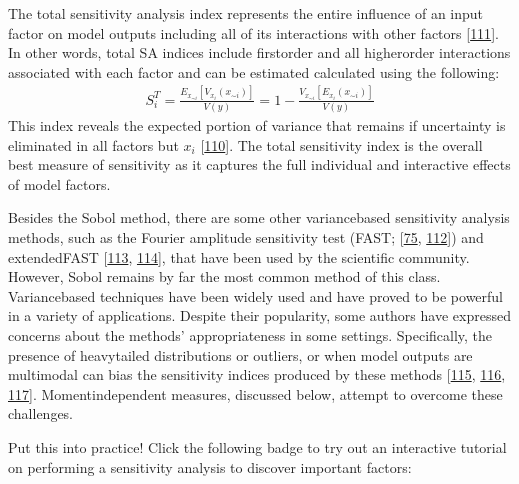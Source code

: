 \documentclass[letterpaper,10pt,english]{sphinxmanual}
\begin{document}
\sphinxAtStartPar
The total sensitivity analysis index represents the entire influence of an input factor on model outputs including all of its interactions with other factors {[}\hyperlink{cite.index:id150}{111}{]}. In other words, total SA indices include first\sphinxhyphen{}order and all higher\sphinxhyphen{}order interactions associated with each factor and can be estimated calculated using the following:
\begin{equation*}
\begin{split}S_i^T= \frac{E_{x_{\sim i}}[V_{x_i}(x_{\sim i})]}{V(y)} = 1 - \frac{V_{x_{\sim i}}[E_{x_{i}}(x_{\sim i})]}{V(y)}\end{split}
\end{equation*}
\sphinxAtStartPar
This index reveals the expected portion of variance that remains if uncertainty is eliminated in all factors but \(x_i\) {[}\hyperlink{cite.index:id149}{110}{]}. The total sensitivity index is the overall best measure of sensitivity as it captures the full individual and interactive effects of model factors.

\sphinxAtStartPar
Besides the Sobol method, there are some other variance\sphinxhyphen{}based sensitivity analysis methods, such as the Fourier amplitude sensitivity test (FAST; {[}\hyperlink{cite.index:id100}{75}, \hyperlink{cite.index:id151}{112}{]}) and extended\sphinxhyphen{}FAST {[}\hyperlink{cite.index:id152}{113}, \hyperlink{cite.index:id153}{114}{]}, that have been used by the scientific community. However, Sobol remains by far the most common method of this class. Variance\sphinxhyphen{}based techniques have been widely used and have proved to be powerful in a variety of applications. Despite their popularity, some authors have expressed concerns about the methods’ appropriateness in some settings. Specifically, the presence of heavy\sphinxhyphen{}tailed distributions or outliers, or when model outputs are multimodal can bias the sensitivity indices produced by these methods {[}\hyperlink{cite.index:id154}{115}, \hyperlink{cite.index:id155}{116}, \hyperlink{cite.index:id156}{117}{]}. Moment\sphinxhyphen{}independent measures, discussed below, attempt to overcome these challenges.


\nopagebreak


\sphinxAtStartPar
Put this into practice! Click the following badge to try out an interactive tutorial on performing a sensitivity analysis to discover important factors:

\sphinxAtStartPar
{}
\end{document}
